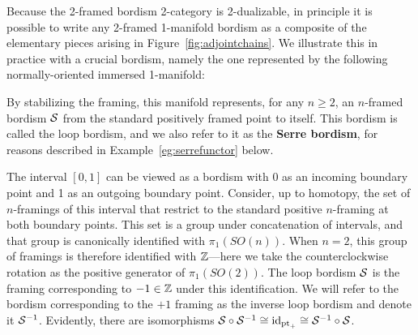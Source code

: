 \documentclass{amsart}
\begin{document}
Because the 2-framed bordism 2-category is 2-dualizable, in principle it is possible to write any 2-framed 1-manifold bordism as a composite of the elementary pieces arising in Figure~\ref{fig:adjointchains}.  We illustrate this in practice with a crucial bordism, namely the one represented by the following normally-oriented immersed 1-manifold:
\begin{center}
\end{center}
By stabilizing the framing, this manifold represents, for any $n \geq 2$, an $n$-framed bordism $\mathcal S$ from the standard positively framed point to itself.  This bordism is called the loop bordism, and we also refer to it as the {\bfseries Serre bordism}, for reasons described in Example~\ref{eg:serrefunctor} below.

\begin{remark}
The interval $[0,1]$ can be viewed as a bordism with 0 as an incoming boundary point and 1 as an outgoing boundary point.  Consider, up to homotopy, the set of $n$-framings of this interval that restrict to the standard positive $n$-framing at both boundary points.  This set is a group under concatenation of intervals, and that group is canonically identified with $\pi_1(SO(n))$.  When $n=2$, this group of framings is therefore identified with $\mathbb Z$---here we take the counterclockwise rotation as the positive generator of $\pi_1(SO(2))$.  The loop bordism $\mathcal S$ is the framing corresponding to $-1 \in \mathbb Z$ under this identification.  We will refer to the bordism corresponding to the $+1$ framing as the inverse loop bordism and denote it $\mathcal S^{-1}$.  Evidently, there are isomorphisms $\mathcal S \circ \mathcal S^{-1} \cong \mathrm{id}_{\mathrm{pt}_+} \cong \mathcal S^{-1} \circ \mathcal S$.
\end{remark}
\end{document}
